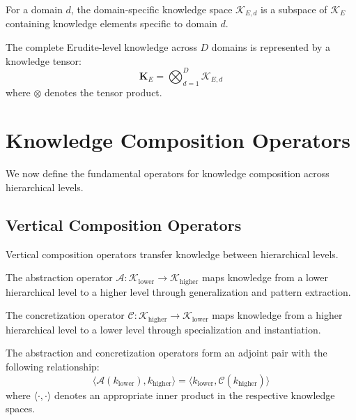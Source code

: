 \begin{definition}
For a domain $d$, the domain-specific knowledge space $\mathcal{K}_{E,d}$ is a subspace of $\mathcal{K}_E$ containing knowledge elements specific to domain $d$.
\end{definition}

\begin{definition}
The complete Erudite-level knowledge across $D$ domains is represented by a knowledge tensor:
\begin{equation}
\mathbf{K}_E = \bigotimes_{d=1}^{D} \mathcal{K}_{E,d}
\end{equation}
where $\otimes$ denotes the tensor product.
\end{definition}

\section{Knowledge Composition Operators}



We now define the fundamental operators for knowledge composition across hierarchical levels.

\subsection{Vertical Composition Operators}

Vertical composition operators transfer knowledge between hierarchical levels.

\begin{definition}
The abstraction operator $\mathcal{A}: \mathcal{K}_{\text{lower}} \rightarrow \mathcal{K}_{\text{higher}}$ maps knowledge from a lower hierarchical level to a higher level through generalization and pattern extraction.
\end{definition}

\begin{definition}
The concretization operator $\mathcal{C}: \mathcal{K}_{\text{higher}} \rightarrow \mathcal{K}_{\text{lower}}$ maps knowledge from a higher hierarchical level to a lower level through specialization and instantiation.
\end{definition}

\begin{theorem}
The abstraction and concretization operators form an adjoint pair with the following relationship:
\begin{equation}
\langle \mathcal{A}(k_{\text{lower}}), k_{\text{higher}} \rangle = \langle k_{\text{lower}}, \mathcal{C}(k_{\text{higher}}) \rangle
\end{equation}
where $\langle \cdot, \cdot \rangle$ denotes an appropriate inner product in the respective knowledge spaces.
\end{theorem}

